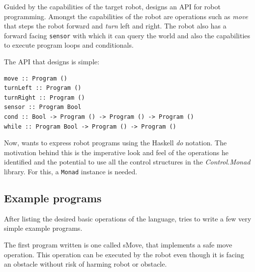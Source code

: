 Guided by the capabilities of the target robot, \studname{} designs an API for 
robot programming. Amongst the capabilities of the robot are operations 
such as {\em move} that steps the robot forward and {\em turn} left and right. 
The robot also has a forward facing {\tt sensor} with which it can query the 
world and also the capabilities to execute program loops and conditionals. 

The API that \studname{} designs is simple: 

\begin{small}
\begin{verbatim} 
move :: Program () 
turnLeft :: Program () 
turnRight :: Program ()
sensor :: Program Bool 
cond :: Bool -> Program () -> Program () -> Program () 
while :: Program Bool -> Program () -> Program () 
\end{verbatim}
\end{small} 

Now, \studname{} wants to express robot programs using the Haskell {\em do} 
notation. The motivation behind this is the imperative look and feel 
of the operations he identified and the potential to use all the control structures 
in the {\em Control.Monad} library. For this, a {\tt Monad} instance is needed. 

\vspace{5mm}


\subsection{Example programs}
After listing the desired basic operations of the language, \studname{} tries to write 
a few very simple example programs.

The first program written is one called sMove, that implements a safe move 
operation. This operation can be executed by the robot even though it is facing 
an obstacle without risk of harming robot or obstacle. 

